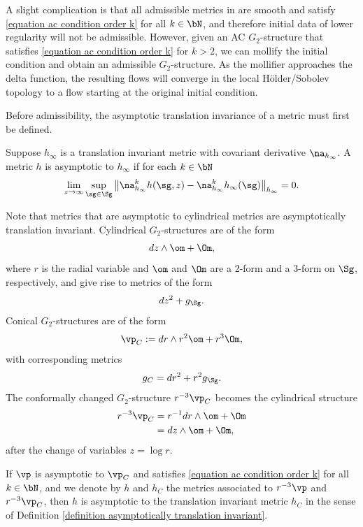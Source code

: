 \documentclass[hidelinks, 12pt, oneside, reqno]{amsart}
\begin{document}
A slight complication is that all admissible metrics in \cite{Lockhart1987} are smooth and satisfy \eqref{equation ac condition order k} for all $k \in \bN$, and therefore initial data of lower regularity will not be admissible. However, given an AC $G_2$-structure that satisfies \eqref{equation ac condition order k} for $k > 2$, we can mollify the initial condition and obtain an admissible $G_2$-structure. As the mollifier approaches the delta function, the resulting flows will converge in the local H\"older/Sobolev topology to a flow starting at the original initial condition. 

Before admissibility, the asymptotic translation invariance of a metric must first be defined. 

\begin{defn}\label{definition asymptotically translation invariant}\cite[Definition 2.1]{Lockhart1987}
Suppose $h_\infty$ is a translation invariant metric with covariant derivative $\na_{h_\infty}$. A metric $h$ is asymptotic to $h_\infty$ if for each $k \in \bN$
\begin{equation}\label{equation asymp trans invariance}
    \lim_{z \rightarrow \infty} \sup_{\sg \in \Sg} \big\| \na_{h_\infty}^k h (\sg, z) -  \na_{h_\infty}^k h_\infty (\sg) \big\|_{h_\infty} = 0.
\end{equation}
\end{defn}

Note that metrics that are asymptotic to cylindrical metrics are asymptotically translation invariant. Cylindrical $G_2$-structures are of the form 
\[
dz \wedge \om + \Om, 
\]
where $r$ is the radial variable and $\om$ and $\Om$ are a 2-form and a 3-form on $\Sg$, respectively, and give rise to metrics of the form
\[
dz^2 + g_{\Sg}. 
\]
Conical $G_2$-structures are of the form 
\[
\vp_C :=  dr \wedge r^2 \om + r^3 \Om, 
\]
with corresponding metrics
\[
g_{C} = dr^2 + r^2 g_{\Sg}. 
\]
The conformally changed $G_2$-structure $r^{-3} \vp_C$ becomes the cylindrical structure
\begin{align*}
    r^{-3} \vp_C &= r^{-1} dr \wedge \om + \Om \\
    &= dz \wedge \om + \Om,
\end{align*}
after the change of variables $z = \log r$. 
\begin{lem}
    If $\vp$ is asymptotic to $\vp_C$ and satisfies \eqref{equation ac condition order k} for all $k \in \bN$, and we denote by $h$ and $h_C$ the metrics associated to $r^{-3}\vp$ and $r^{-3}\vp_C$, then $h$ is asymptotic to the translation invariant metric $h_C$ in the sense of Definition \ref{definition asymptotically translation invariant}. 
\end{lem}
\end{document}
